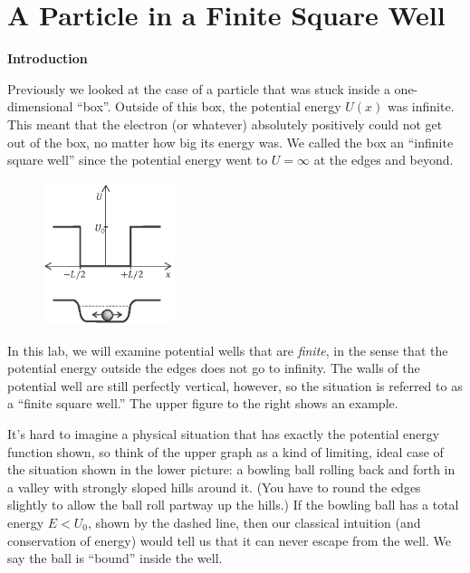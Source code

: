 \section{A Particle in a Finite Square Well}

\makelabheader %

\bigskip

\textbf{Introduction}

Previously we looked at the case of a particle that was stuck inside a one-dimensional ``box''. 
Outside of this box, the potential energy $U(x)$ was infinite. This meant that the electron (or whatever) absolutely positively could not get out of the box, no matter how big its energy was. 
We called the box an ``infinite square well'' since the potential energy went to $U=\infty$ at the edges and beyond.

\begin{figure}
\begin{center}
\vspace{-0.2in}
\includegraphics[width=0.34\textwidth]{particle_in_finite_well/finite_potential.eps}
\end{center}
\end{figure}

In this lab, we will examine potential wells that are \textit{finite}, in the sense that the potential energy outside the edges does not go to infinity. The walls of the potential well are still perfectly vertical, however, so the situation is referred to as a ``finite square well.'' The upper figure to the right shows an example.

It's hard to imagine a physical situation that has exactly the potential energy function shown, so think of the upper graph as a kind of limiting, ideal case of the situation shown in the lower picture: a bowling ball rolling back and forth in a valley with strongly sloped hills around it.  (You have to round the edges slightly to allow the ball roll partway up the hills.)  If the bowling ball has a total energy $E<U_0$, shown by the dashed line, then our classical intuition (and conservation of energy) would tell us that it can never escape from the well.  We say the ball is ``bound'' inside the well.

